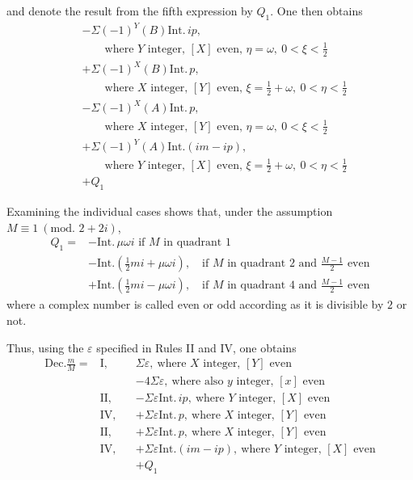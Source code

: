 and denote the result from the fifth expression by $Q_1$. One then obtains
\[
\begin{aligned}
&-\Sigma(-1)^Y(B)\mathrm{Int.}\,ip,\\
&\qquad\text{where }Y\text{ integer, }[X]\text{ even, }\eta=\omega,\ 0<\xi<\tfrac12\\
&+\Sigma(-1)^X(B)\mathrm{Int.}\,p,\\
&\qquad\text{where }X\text{ integer, }[Y]\text{ even, }\xi=\tfrac12+\omega,\ 0<\eta<\tfrac12\\
&-\Sigma(-1)^X(A)\mathrm{Int.}\,p,\\
&\qquad\text{where }X\text{ integer, }[Y]\text{ even, }\eta=\omega,\ 0<\xi<\tfrac12\\
&+\Sigma(-1)^Y(A)\mathrm{Int.}(im-ip),\\
&\qquad\text{where }Y\text{ integer, }[X]\text{ even, }\xi=\tfrac12+\omega,\ 0<\eta<\tfrac12\\
&+Q_1
\end{aligned}
\]

Examining the individual cases shows that, under the assumption $M\equiv1\ (\text{mod. }2+2i)$,
\[
\begin{aligned}
Q_1={}&-\mathrm{Int.}\,\mu\omega i\text{ if }M\text{ in quadrant }1\text{}\\
&-\mathrm{Int.}(\tfrac12mi+\mu\omega i),\quad\text{if }M\text{ in quadrant }2\text{ and }\frac{M-1}{2}\text{ even}\\
&+\mathrm{Int.}(\tfrac12mi-\mu\omega i),\quad\text{if }M\text{ in quadrant }4\text{ and }\frac{M-1}{2}\text{ even}
\end{aligned}
\]
where a complex number is called even or odd according as it is divisible by $2$ or not.

Thus, using the $\varepsilon$ specified in Rules II and IV, one obtains
\[
\begin{aligned}
\mathrm{Dec.}\frac mM={}&\mathrm{I},& &\Sigma\varepsilon,\ \text{where }X\text{ integer, }[Y]\text{ even}\\
&&&-4\Sigma\varepsilon,\ \text{where also }y\text{ integer, }[x]\text{ even}\\
&\mathrm{II},&&-\Sigma\varepsilon\mathrm{Int.}\,ip,\ \text{where }Y\text{ integer, }[X]\text{ even}\\
&\mathrm{IV},&&+\Sigma\varepsilon\mathrm{Int.}\,p,\ \text{where }X\text{ integer, }[Y]\text{ even}\\
&\mathrm{II},&&+\Sigma\varepsilon\mathrm{Int.}\,p,\ \text{where }X\text{ integer, }[Y]\text{ even}\\
&\mathrm{IV},&&+\Sigma\varepsilon\mathrm{Int.}(im-ip),\ \text{where }Y\text{ integer, }[X]\text{ even}\\
&&&+Q_1
\end{aligned}
\]


